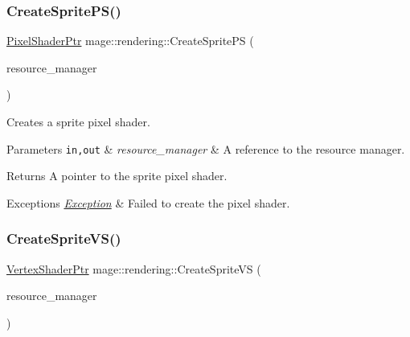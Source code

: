 \subsubsection{\texorpdfstring{Create\+Sprite\+P\+S()}{CreateSpritePS()}}
{\footnotesize\ttfamily \mbox{\hyperlink{namespacemage_1_1rendering_af03d922b228ee9c8542baaa2ecc9f259}{Pixel\+Shader\+Ptr}} mage\+::rendering\+::\+Create\+Sprite\+PS (\begin{DoxyParamCaption}\item[{\mbox{\hyperlink{classmage_1_1rendering_1_1_resource_manager}{Resource\+Manager}} \&}]{resource\+\_\+manager }\end{DoxyParamCaption})}

Creates a sprite pixel shader.


\begin{DoxyParams}[1]{Parameters}
\mbox{\tt in,out}  & {\em resource\+\_\+manager} & A reference to the resource manager. \\
\hline
\end{DoxyParams}
\begin{DoxyReturn}{Returns}
A pointer to the sprite pixel shader. 
\end{DoxyReturn}

\begin{DoxyExceptions}{Exceptions}
{\em \mbox{\hyperlink{classmage_1_1_exception}{Exception}}} & Failed to create the pixel shader. \\
\hline
\end{DoxyExceptions}
\mbox{\label{namespacemage_1_1rendering_a52f27cd68ea8d18864fd9bc1c53cccc4}} 
\subsubsection{\texorpdfstring{Create\+Sprite\+V\+S()}{CreateSpriteVS()}}
{\footnotesize\ttfamily \mbox{\hyperlink{namespacemage_1_1rendering_aaf704b9c54a4181f4950a1761de69dda}{Vertex\+Shader\+Ptr}} mage\+::rendering\+::\+Create\+Sprite\+VS (\begin{DoxyParamCaption}\item[{\mbox{\hyperlink{classmage_1_1rendering_1_1_resource_manager}{Resource\+Manager}} \&}]{resource\+\_\+manager }\end{DoxyParamCaption})}

